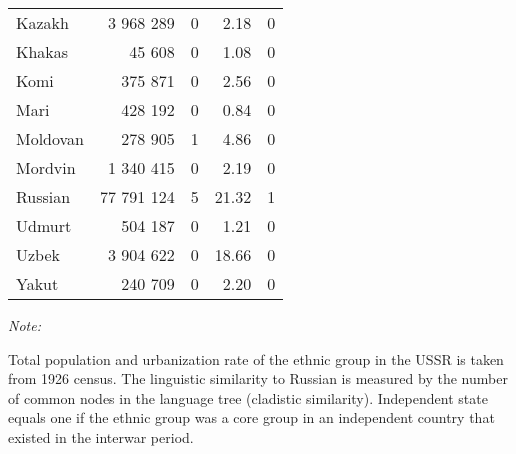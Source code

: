 \begin{table}[!h]
\begin{threeparttable}
\begin{tabular}{lrrrr}
Kazakh & 3 968 289 & 0 & 2.18 & 0\\
Khakas & 45 608 & 0 & 1.08 & 0\\
Komi & 375 871 & 0 & 2.56 & 0\\
Mari & 428 192 & 0 & 0.84 & 0\\
Moldovan & 278 905 & 1 & 4.86 & 0\\
Mordvin & 1 340 415 & 0 & 2.19 & 0\\
Russian & 77 791 124 & 5 & 21.32 & 1\\
Udmurt & 504 187 & 0 & 1.21 & 0\\
Uzbek & 3 904 622 & 0 & 18.66 & 0\\
Yakut & 240 709 & 0 & 2.20 & 0\\
\bottomrule
\end{tabular}
\begin{tablenotes}
\item \textit{Note: } 
\item Total population and urbanization rate of the ethnic group in the USSR is taken from 1926 census. The linguistic similarity to Russian is measured by the number of common nodes in the language tree (cladistic similarity). Independent state equals one if the ethnic group was a core group in an independent country that existed in the interwar period.
\end{tablenotes}
\end{threeparttable}
\end{table}